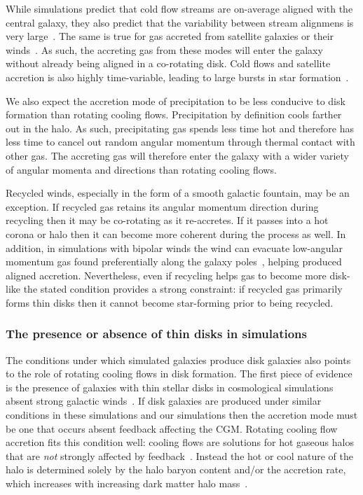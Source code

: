 \documentclass[fleqn,usenatbib]{mnras}
\begin{document}
While simulations predict that cold flow streams are on-average aligned with the central galaxy, they also predict that the variability between stream alignmens is very large~\citep[e.g.][]{Danovich2012, Stewart2011a, Stewart2013, Stewart2017}.
The same is true for gas accreted from satellite galaxies or their winds~\citep[e.g.][]{Stewart2011, Hafen2019}.
As such, the accreting gas from these modes will enter the galaxy without already being aligned in a co-rotating disk.
Cold flows and satellite accretion is also highly time-variable, leading to large bursts in star formation~\citep[e.g.][]{Muratov2015, Muratov2017}.

We also expect the accretion mode of precipitation to be less conducive to disk formation than rotating cooling flows.
Precipitation by definition cools farther out in the halo.
As such, precipitating gas spends less time hot and therefore has less time to cancel out random angular momentum through thermal contact with other gas.
The accreting gas will therefore enter the galaxy with a wider variety of angular momenta and directions than rotating cooling flows.

Recycled winds, especially in the form of a smooth galactic fountain, may be an exception.
If recycled gas retains its angular momentum direction during recycling then it may be co-rotating as it re-accretes.
If it passes into a hot corona or halo then it can become more coherent during the process as well.
In addition, in simulations with bipolar winds the wind can evacuate low-angular momentum gas found preferentially along the galaxy poles~\citep[e.g.][]{DeFelippis2017}, helping produced aligned accretion.
Nevertheless, even if recycling helps gas to become more disk-like the stated condition provides a strong constraint:
if recycled gas primarily forms thin disks then it cannot become star-forming prior to being recycled.

\subsubsection{The presence or absence of thin disks in simulations}
\label{s: disk formation -- population}

The conditions under which simulated galaxies produce disk galaxies also points to the role of rotating cooling flows in disk formation.
The first piece of evidence is the presence of galaxies with thin stellar disks in cosmological simulations absent strong galactic winds~\citep{Guedes2011, Bird2013}.
If disk galaxies are produced under similar conditions in these simulations and our simulations then the accretion mode must be one that occurs absent feedback affecting the CGM.
Rotating cooling flow accretion fits this condition well:
cooling flows are solutions for hot gaseous halos that are \textit{not} strongly affected by feedback~\citep{Stern2019}.
Instead the hot or cool nature of the halo is determined solely by the halo baryon content and/or the accretion rate, which increases with increasing dark matter halo mass~\citep{Stern2020a}.
\end{document}
